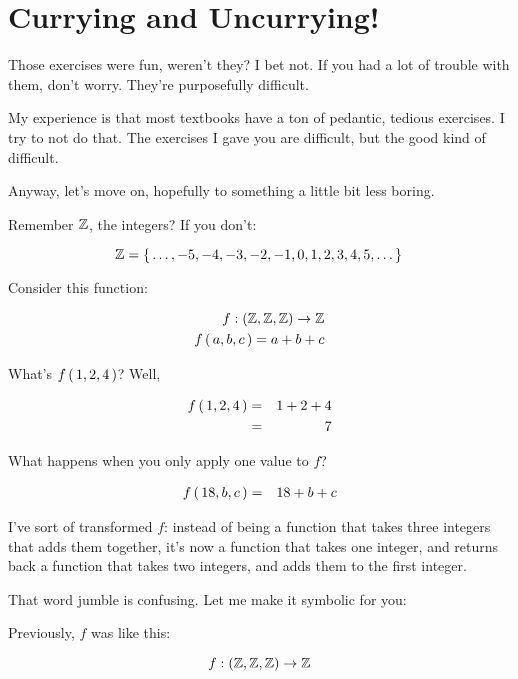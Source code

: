 \section{Currying and Uncurrying!}

Those exercises were fun, weren't they? I bet not. If you had a lot of trouble
with them, don't worry. They're purposefully difficult.

My experience is that most textbooks have a ton of pedantic, tedious
exercises. I try to not do that. The exercises I gave you are difficult, but the
good kind of difficult.

Anyway, let's move on, hopefully to something a little bit less boring.

Remember $\mathbb{Z}$, the integers? If you don't:

\begin{equation}
    \mathbb{Z} = \left\{\, \dots,-5,-4,-3,-2,-1,0,1,2,3,4,5,\dots \,\right\} \\
\end{equation}

Consider this function:

\begin{eqnarray}
    f : \left( \mathbb{Z}, \mathbb{Z}, \mathbb{Z} \right) \to \mathbb{Z} \\
    f \left(\, a,b,c \,\right) = a + b + c
\end{eqnarray}

What's $f \left(\, 1,2,4 \,\right)$? Well,

\begin{eqnarray}
    f \left(\, 1,2,4 \,\right) & = & 1 + 2 + 4 \\
                   & = & 7 \\
\end{eqnarray}

What happens when you only apply one value to $f$?

\begin{eqnarray}
    f \left(\, 18,b,c \,\right) & = & 18 + b + c \\
\end{eqnarray}

I've sort of transformed $f$: instead of being a function that takes three
integers that adds them together, it's now a function that takes one integer,
and returns back a function that takes two integers, and adds them to the first
integer.

That word jumble is confusing. Let me make it symbolic for you:

Previously, $f$ was like this:

\begin{equation}
    f : \left( \mathbb{Z}, \mathbb{Z}, \mathbb{Z} \right) \to \mathbb{Z}
\end{equation}

